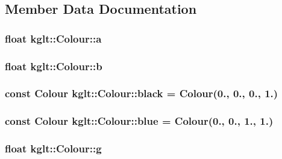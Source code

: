 \subsection{Member Data Documentation}
\hypertarget{structkglt_1_1_colour_a477f20a3effe23ae4ed757667de4e9ca}{
\subsubsection[{a}]{\setlength{\rightskip}{0pt plus 5cm}float kglt\-::\-Colour\-::a}}\label{structkglt_1_1_colour_a477f20a3effe23ae4ed757667de4e9ca}
\hypertarget{structkglt_1_1_colour_a124eb55eb048ac50b2ac2bb9901dc9a2}{
\subsubsection[{b}]{\setlength{\rightskip}{0pt plus 5cm}float kglt\-::\-Colour\-::b}}\label{structkglt_1_1_colour_a124eb55eb048ac50b2ac2bb9901dc9a2}
\hypertarget{structkglt_1_1_colour_a8804856e77d8e545b677a987c596f65a}{
\subsubsection[{black}]{\setlength{\rightskip}{0pt plus 5cm}const {\bf Colour} kglt\-::\-Colour\-::black = {\bf Colour}(0., 0., 0., 1.)\hspace{0.3cm}{\ttfamily [static]}}}\label{structkglt_1_1_colour_a8804856e77d8e545b677a987c596f65a}
\hypertarget{structkglt_1_1_colour_a75fa8717d966a906c62f7c3b87de4cae}{
\subsubsection[{blue}]{\setlength{\rightskip}{0pt plus 5cm}const {\bf Colour} kglt\-::\-Colour\-::blue = {\bf Colour}(0., 0., 1., 1.)\hspace{0.3cm}{\ttfamily [static]}}}\label{structkglt_1_1_colour_a75fa8717d966a906c62f7c3b87de4cae}
\hypertarget{structkglt_1_1_colour_ae5601b361c9c92020390b3883662f8a1}{
\subsubsection[{g}]{\setlength{\rightskip}{0pt plus 5cm}float kglt\-::\-Colour\-::g}}\label{structkglt_1_1_colour_ae5601b361c9c92020390b3883662f8a1}
